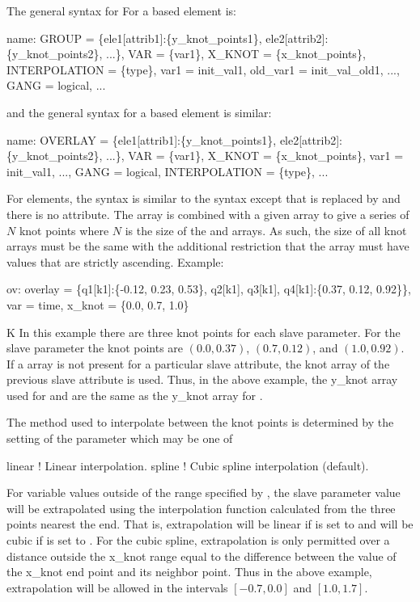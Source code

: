 The general syntax for For a  based  element is:
\begin{example}
  name: GROUP = \{ele1[attrib1]:\{y_knot_points1\}, ele2[attrib2]:\{y_knot_points2\}, ...\}, 
              VAR = \{var1\}, X_KNOT = \{x_knot_points\}, INTERPOLATION = \{type\},
              var1 = init_val1, old_var1 = init_val_old1, ..., GANG = logical, ... 
\end{example}
and the general syntax for a  based  element is similar:
\begin{example}
  name: OVERLAY = \{ele1[attrib1]:\{y_knot_points1\}, ele2[attrib2]:\{y_knot_points2\}, ...\}, 
        VAR = \{var1\}, X_KNOT = \{x_knot_points\}, var1 = init_val1, ..., 
        GANG = logical, INTERPOLATION = \{type\}, ...
\end{example}
For  elements, the syntax is similar to the  syntax except that 
is replaced by  and there is no  attribute. The  array is combined
with a given  array to give a series of $N$ knot points where $N$ is the size of the
 and  arrays. As such, the size of all knot arrays must be the same with the
additional restriction that the  array must have values that are strictly ascending.
Example:
\begin{example}
  ov: overlay = \{q1[k1]:\{-0.12, 0.23, 0.53\}, q2[k1], q3[k1], q4[k1]:\{0.37, 0.12, 0.92\}\}, 
        var = {time}, x_knot = \{0.0, 0.7, 1.0\}
\end{example}K
In this example there are three knot points for each slave parameter. For the slave parameter
 the knot points are $(0.0, 0.37)$, $(0.7, 0.12)$, and $(1.0, 0.92)$.  If a
 array is not present for a particular slave attribute, the knot array of the
previous slave attribute is used. Thus, in the above example, the y_knot array used for 
and  are the same as the y_knot array for .

The method used to interpolate between the knot points is determined by the setting of the
 parameter which may be one of
\begin{example}
  linear      ! Linear interpolation.
  spline      ! Cubic spline interpolation (default).
\end{example}
For variable values outside of the range specified by , the slave parameter value will be
extrapolated using the interpolation function calculated from the three points nearest the end. That
is, extrapolation will be linear if  is set to  and will be cubic if
 is set to . For the cubic spline, extrapolation is only permitted over a
distance outside the x_knot range equal to the difference between the value of the x_knot end point
and its neighbor point. Thus in the above example, extrapolation will be allowed in the intervals
$[-0.7, 0.0]$ and $[1.0, 1.7]$.

